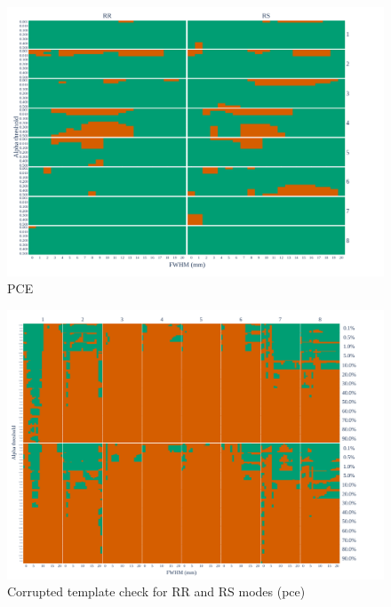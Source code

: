 \documentclass[lettersize,journal]{IEEEtran}
\begin{document}
    \begin{figure}
        \centering
        \includegraphics[width=\linewidth]{figures/exclude_pce.pdf}
        \caption{PCE}
        \label{fig:loo_pce}
    \end{figure}

    \begin{figure}
        \centering
        \includegraphics[width=\linewidth]{figures/template/template_pce.pdf}
        \caption{Corrupted template check for RR and RS modes (pce)}
    \end{figure}

  




\end{document}
